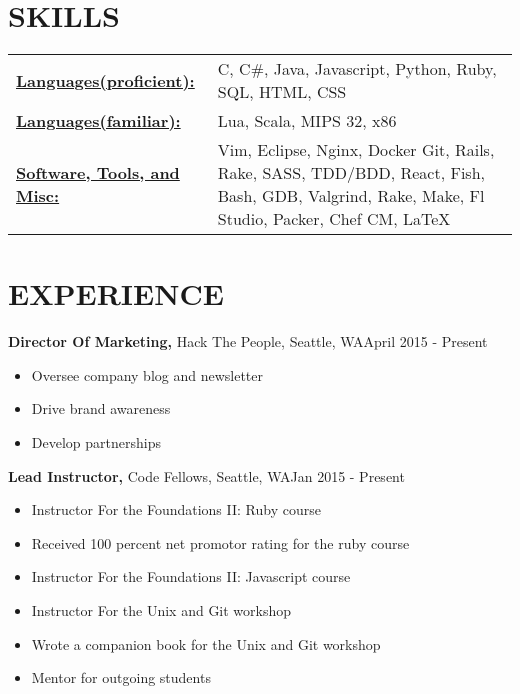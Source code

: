 \documentclass{res}
\begin{document}
 
\address{Seattle, WA charliec364@gmail.com }


\begin{resume}
\footnotesize

\section{SKILLS}
   \begin{tabular}{l p{3in}}
     \underline{\bf Languages(proficient):} & C, C\#, Java, Javascript, Python, Ruby, SQL, HTML, CSS \\
     \underline{\bf Languages(familiar):} & Lua, Scala, MIPS 32, x86 \\
     \underline{\bf Software, Tools, and Misc:} &  Vim, Eclipse, Nginx, Docker
                        Git, Rails, Rake, SASS, TDD/BDD, React,
                        Fish, Bash, GDB, Valgrind,  
                        Rake, Make, Fl Studio, Packer, Chef CM, \LaTeX\
 \end{tabular}
 
\section{EXPERIENCE}
  {\bf Director Of Marketing,} Hack The People, Seattle, WA\hfill April 2015 - Present 
  \begin{itemize} \itemsep -2pt  %
    \item Oversee company blog and newsletter
    \item Drive brand awareness
    \item Develop partnerships
  \end{itemize}

  {\bf Lead Instructor,} Code Fellows, Seattle, WA\hfill Jan 2015 - Present
  \begin{itemize} \itemsep -2pt  %
    \item Instructor For the Foundations II: Ruby course
    \item Received 100 percent net promotor rating for the ruby course
    \item Instructor For the Foundations II: Javascript course
    \item Instructor For the Unix and Git workshop
    \item Wrote a companion book for the Unix and Git workshop
    \item Mentor for outgoing students
  \end{itemize}


\end{resume}
\end{document}
